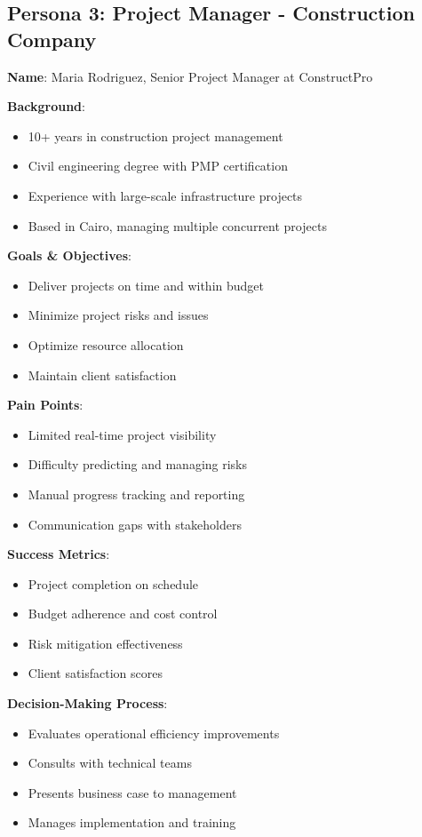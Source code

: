 \documentclass[business]{../templates/infraradar-main}
\begin{document}
\subsection{Persona 3: Project Manager - Construction Company}
\textbf{Name}: Maria Rodriguez, Senior Project Manager at ConstructPro

\textbf{Background}:
\begin{itemize}
    \item 10+ years in construction project management
    \item Civil engineering degree with PMP certification
    \item Experience with large-scale infrastructure projects
    \item Based in Cairo, managing multiple concurrent projects
\end{itemize}

\textbf{Goals \& Objectives}:
\begin{itemize}
    \item Deliver projects on time and within budget
    \item Minimize project risks and issues
    \item Optimize resource allocation
    \item Maintain client satisfaction
\end{itemize}

\textbf{Pain Points}:
\begin{itemize}
    \item Limited real-time project visibility
    \item Difficulty predicting and managing risks
    \item Manual progress tracking and reporting
    \item Communication gaps with stakeholders
\end{itemize}

\textbf{Success Metrics}:
\begin{itemize}
    \item Project completion on schedule
    \item Budget adherence and cost control
    \item Risk mitigation effectiveness
    \item Client satisfaction scores
\end{itemize}

\textbf{Decision-Making Process}:
\begin{itemize}
    \item Evaluates operational efficiency improvements
    \item Consults with technical teams
    \item Presents business case to management
    \item Manages implementation and training
\end{itemize}
\end{document}
